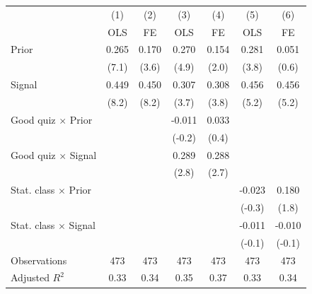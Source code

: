 \begin{tabular}{l*{6}{c}}
\hline\hline
                &\multicolumn{1}{c}{(1)}&\multicolumn{1}{c}{(2)}&\multicolumn{1}{c}{(3)}&\multicolumn{1}{c}{(4)}&\multicolumn{1}{c}{(5)}&\multicolumn{1}{c}{(6)}\\
                &\multicolumn{1}{c}{OLS}&\multicolumn{1}{c}{FE}&\multicolumn{1}{c}{OLS}&\multicolumn{1}{c}{FE}&\multicolumn{1}{c}{OLS}&\multicolumn{1}{c}{FE}\\
\hline
Prior           &    0.265\sym{***}&    0.170\sym{***}&    0.270\sym{***}&    0.154\sym{**} &    0.281\sym{***}&    0.051         \\
                &    (7.1)         &    (3.6)         &    (4.9)         &    (2.0)         &    (3.8)         &    (0.6)         \\
Signal          &    0.449\sym{***}&    0.450\sym{***}&    0.307\sym{***}&    0.308\sym{***}&    0.456\sym{***}&    0.456\sym{***}\\
                &    (8.2)         &    (8.2)         &    (3.7)         &    (3.8)         &    (5.2)         &    (5.2)         \\
Good quiz $\times$ Prior&                  &                  &   -0.011         &    0.033         &                  &                  \\
                &                  &                  &   (-0.2)         &    (0.4)         &                  &                  \\
Good quiz $\times$ Signal&                  &                  &    0.289\sym{***}&    0.288\sym{***}&                  &                  \\
                &                  &                  &    (2.8)         &    (2.7)         &                  &                  \\
Stat. class $\times$ Prior&                  &                  &                  &                  &   -0.023         &    0.180\sym{*}  \\
                &                  &                  &                  &                  &   (-0.3)         &    (1.8)         \\
Stat. class $\times$ Signal&                  &                  &                  &                  &   -0.011         &   -0.010         \\
                &                  &                  &                  &                  &   (-0.1)         &   (-0.1)         \\
\hline
Observations    &      473         &      473         &      473         &      473         &      473         &      473         \\
Adjusted \(R^{2}\)&     0.33         &     0.34         &     0.35         &     0.37         &     0.33         &     0.34         \\
\hline\hline
\end{tabular}
